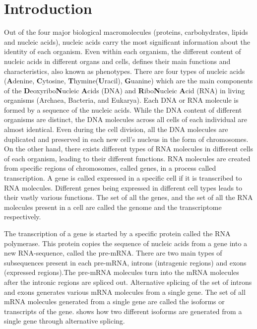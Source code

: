 
\renewcommand{\thechapter}{1}


\chapter{Introduction} %
\label{intro} %

Out of the four major biological macromolecules (proteins, carbohydrates, lipids 
and nucleic acids), nucleic acids carry the most significant information about 
the identity of each organism. Even within each organism, the different 
content of nucleic acids in different organs and cells, defines their main 
functions and characteristics, also known as phenotypes. There are four 
types of nucleic acids (\textbf{A}denine, \textbf{C}ytosine, 
\textbf{T}hymine(\textbf{U}racil), \textbf{G}uanine) which are 
the main components of the \textbf{D}eoxyribo\textbf{N}ucleic 
\textbf{A}cids (DNA) and \textbf{R}ibo\textbf{N}ucleic 
\textbf{A}cid (RNA) in living organisms (Archaea, Bacteria, and Eukarya). 
Each DNA or RNA molecule is formed by a sequence of the nucleic acids. 
While the DNA content of different organisms are distinct, the DNA molecules 
across all cells of each individual are almost identical. Even during 
the cell division, all the DNA molecules are duplicated and preserved 
in each new cell's nucleus in the form of chromosomes. On the other hand, 
there exists different types of RNA molecules in different cells of each 
organism, leading to their different functions. RNA molecules are created 
from specific regions of chromosomes, called genes, in a process called 
transcription. A gene is called expressed in a specific cell if it is 
transcribed to RNA molecules. Different genes being expressed in different 
cell types leads to their vastly various functions. The set of all the genes, 
and the set of all the RNA molecules present in a cell are called the genome 
and the transcriptome respectively.

The transcription of a gene is started by a specific protein called the RNA 
polymerase. This protein copies the sequence of nucleic acids from a gene into 
a new RNA-sequence, called the pre-mRNA. There are two main types of 
subsequences present in each pre-mRNA, introns (intragenic regions) and exons 
(expressed regions).The pre-mRNA molecules turn into the mRNA molecules after 
the intronic regions are spliced out.
Alternative splicing of the set of introns and exons generates various mRNA 
molecules from a single gene. The set of all mRNA molecules generated from a 
single gene are called the isoforms or transcripts of the gene. 
 shows how two different isoforms are generated 
from a single gene through alternative splicing.

